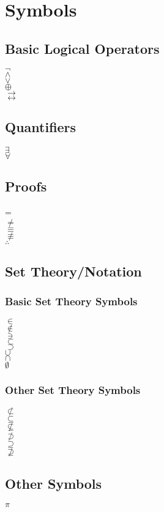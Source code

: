 \documentclass[letterpaper]{article}
\begin{document}
\section*{Symbols}
\subsection*{Basic Logical Operators}
$\neg$\\
$\land$\\
$\lor$\\
$\oplus$\\
$\to$\\
$\leftrightarrow$\\

\subsection*{Quantifiers}
$\exists$\\
$\forall$\\

\subsection*{Proofs}
=\\
$\neq$\\
$\equiv$\\
$\not\equiv$\\
$\therefore$\\

\subsection*{Set Theory/Notation}
\subsubsection*{Basic Set Theory Symbols}
$\in$\\
$\notin$\\
$\ni$\\
$\subset$\\
$\supset$\\
$\cup$\\
$\cap$\\
$\emptyset$\\

\subsubsection*{Other Set Theory Symbols}
$\not\subset$\\
$\subseteq$\\
$\nsubseteq$\\
$\not\supset$\\
$\supseteq$\\
$\nsupseteq$\\

\subsection*{Other Symbols}
$\pi$\\
\end{document}
